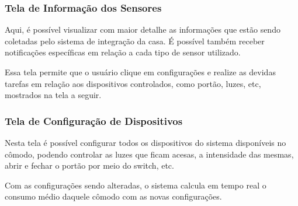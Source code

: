 \subsubsection{Tela de Informação dos Sensores}


\par Aqui, é possível visualizar com maior detalhe as informações que estão sendo coletadas pelo sistema de integração da casa. É possível também receber notificações específicas em relação a cada tipo de sensor utilizado.
\par Essa tela permite que o usuário clique em configurações e realize as devidas tarefas em relação aos dispositivos controlados, como portão, luzes, etc, mostrados na tela a seguir.

\subsubsection{Tela de Configuração de Dispositivos}


\par Nesta tela é possível configurar todos os dispositivos do sistema disponíveis no cômodo, podendo controlar as luzes que ficam acesas, a intensidade das mesmas, abrir e fechar o portão por meio do switch, etc.
\par Com as configurações sendo alteradas, o sistema calcula em tempo real o consumo médio daquele cômodo com as novas configurações.
